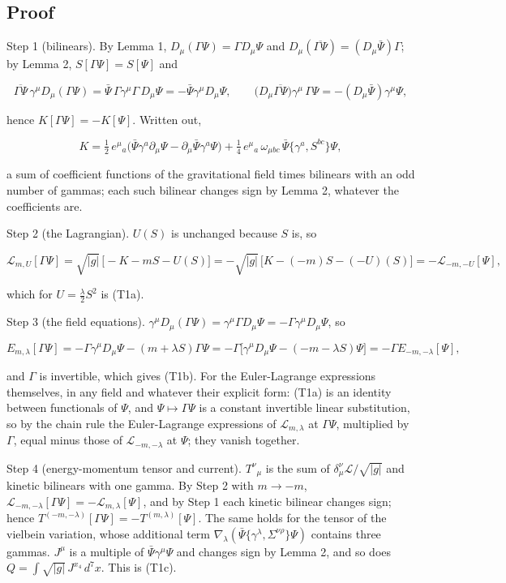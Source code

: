 \documentclass[11pt]{article}
\begin{document}
\subsection{Proof}

Step 1 (bilinears). By Lemma 1, $D_\mu(\Gamma\Psi) = \Gamma D_\mu\Psi$ and $D_\mu(\overline{\Gamma\Psi}) = (D_\mu\bar\Psi)\Gamma$; by Lemma 2, $S[\Gamma\Psi] = S[\Psi]$ and

\[
\overline{\Gamma\Psi}\,\gamma^\mu D_\mu(\Gamma\Psi) = \bar\Psi\,\Gamma\gamma^\mu\Gamma\,D_\mu\Psi = -\bar\Psi\gamma^\mu D_\mu\Psi ,
\qquad
\big(D_\mu\overline{\Gamma\Psi}\big)\gamma^\mu\,\Gamma\Psi = -(D_\mu\bar\Psi)\gamma^\mu\Psi ,
\]

hence $K[\Gamma\Psi] = -K[\Psi]$. Written out,

\[
K = \tfrac12\,e^\mu{}_a\big(\bar\Psi\gamma^a\partial_\mu\Psi - \partial_\mu\bar\Psi\gamma^a\Psi\big) + \tfrac14\,e^\mu{}_a\,\omega_{\mu bc}\,\bar\Psi\{\gamma^a,S^{bc}\}\Psi ,
\]

a sum of coefficient functions of the gravitational field times bilinears with an odd number of gammas; each such bilinear changes sign by Lemma 2, whatever the coefficients are.

Step 2 (the Lagrangian). $U(S)$ is unchanged because $S$ is, so

\[
\mathcal{L}_{m,U}[\Gamma\Psi] = \sqrt{|g|}\,\big[-K - mS - U(S)\big] = -\sqrt{|g|}\,\big[K - (-m)S - (-U)(S)\big] = -\mathcal{L}_{-m,-U}[\Psi] ,
\]

which for $U = \frac{\lambda}{2}S^2$ is (T1a).

Step 3 (the field equations). $\gamma^\mu D_\mu(\Gamma\Psi) = \gamma^\mu\Gamma D_\mu\Psi = -\Gamma\gamma^\mu D_\mu\Psi$, so

\[
E_{m,\lambda}[\Gamma\Psi] = -\Gamma\gamma^\mu D_\mu\Psi - (m + \lambda S)\Gamma\Psi = -\Gamma\big[\gamma^\mu D_\mu\Psi - (-m - \lambda S)\Psi\big] = -\Gamma E_{-m,-\lambda}[\Psi] ,
\]

and $\Gamma$ is invertible, which gives (T1b). For the Euler-Lagrange expressions themselves, in any field and whatever their explicit form: (T1a) is an identity between functionals of $\Psi$, and $\Psi \mapsto \Gamma\Psi$ is a constant invertible linear substitution, so by the chain rule the Euler-Lagrange expressions of $\mathcal{L}_{m,\lambda}$ at $\Gamma\Psi$, multiplied by $\Gamma$, equal minus those of $\mathcal{L}_{-m,-\lambda}$ at $\Psi$; they vanish together.

Step 4 (energy-momentum tensor and current). $T^\nu{}_\mu$ is the sum of $\delta^\nu_\mu\mathcal{L}/\sqrt{|g|}$ and kinetic bilinears with one gamma. By Step 2 with $m \to -m$, $\mathcal{L}_{-m,-\lambda}[\Gamma\Psi] = -\mathcal{L}_{m,\lambda}[\Psi]$, and by Step 1 each kinetic bilinear changes sign; hence $T^{(-m,-\lambda)}[\Gamma\Psi] = -T^{(m,\lambda)}[\Psi]$. The same holds for the tensor of the vielbein variation, whose additional term $\nabla_\lambda(\bar\Psi\{\gamma^\lambda,\Sigma^{\nu\rho}\}\Psi)$ contains three gammas. $J^\mu$ is a multiple of $\bar\Psi\gamma^\mu\Psi$ and changes sign by Lemma 2, and so does $Q = \int\sqrt{|g|}\,J^{x_4}\,d^7x$. This is (T1c).
\end{document}
